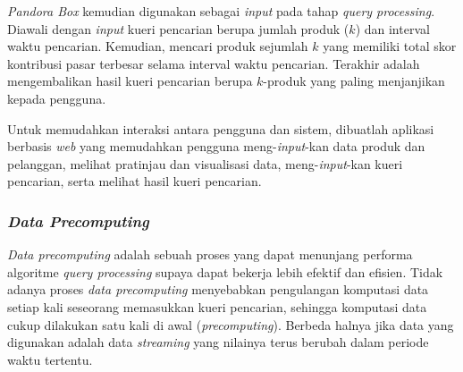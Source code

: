 \textit{Pandora Box} kemudian digunakan sebagai \textit{input} pada tahap \textit{query processing}. Diawali dengan \textit{input} kueri pencarian berupa jumlah produk ($k$) dan interval waktu pencarian. Kemudian, mencari produk sejumlah $k$ yang memiliki total skor kontribusi pasar terbesar selama interval waktu pencarian. Terakhir adalah mengembalikan hasil kueri pencarian berupa $k$-produk yang paling menjanjikan kepada pengguna.

Untuk memudahkan interaksi antara pengguna dan sistem, dibuatlah aplikasi berbasis \textit{web} yang memudahkan pengguna meng-\textit{input}-kan data produk dan pelanggan, melihat pratinjau dan visualisasi data, meng-\textit{input}-kan kueri pencarian, serta melihat hasil kueri pencarian.   

\subsubsection{\textit{Data Precomputing}}
\tab \textit{Data precomputing} adalah sebuah proses yang dapat menunjang performa algoritme \textit{query processing} supaya dapat bekerja lebih efektif dan efisien. Tidak adanya proses \textit{data precomputing} menyebabkan pengulangan komputasi data setiap kali seseorang memasukkan kueri pencarian, sehingga komputasi data cukup dilakukan satu kali di awal (\textit{precomputing}). Berbeda halnya jika data yang digunakan adalah data \textit{streaming} yang nilainya terus berubah dalam periode waktu tertentu.
	
